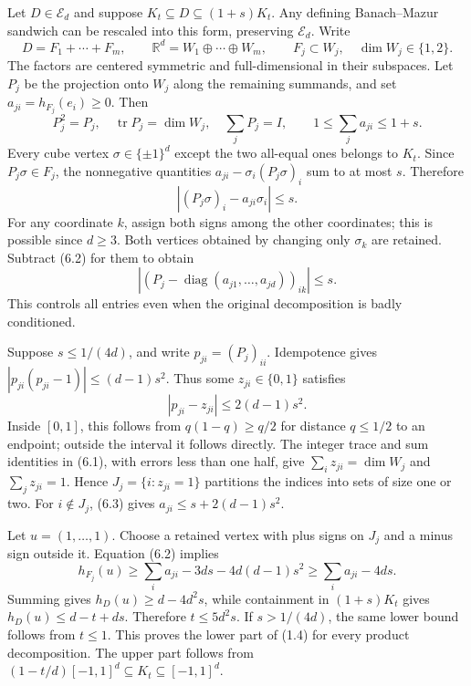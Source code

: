 \documentclass[
  11pt,
]{article}
\begin{document}
Let \(D\in\mathcal E_d\) and suppose
\(K_t\subseteq D\subseteq(1+s)K_t\). Any defining Banach--Mazur sandwich
can be rescaled into this form, preserving \(\mathcal E_d\). Write \[
 D=F_1+\cdots+F_m,\qquad
 \mathbb R^d=W_1\oplus\cdots\oplus W_m,
 \qquad F_j\subset W_j,\quad \dim W_j\in\{1,2\}.
\] The factors are centered symmetric and full-dimensional in their
subspaces. Let \(P_j\) be the projection onto \(W_j\) along the
remaining summands, and set \(a_{ji}=h_{F_j}(e_i)\ge0\). Then \[
 P_j^2=P_j,\quad\operatorname{tr}P_j=\dim W_j,\quad\sum_jP_j=I,
 \qquad 1\le\sum_ja_{ji}\le1+s.                               \tag{6.1}
\] Every cube vertex \(\sigma\in\{\pm1\}^d\) except the two all-equal
ones belongs to \(K_t\). Since \(P_j\sigma\in F_j\), the nonnegative
quantities \(a_{ji}-\sigma_i(P_j\sigma)_i\) sum to at most \(s\).
Therefore \[
 |(P_j\sigma)_i-a_{ji}\sigma_i|\le s.                          \tag{6.2}
\] For any coordinate \(k\), assign both signs among the other
coordinates; this is possible since \(d\ge3\). Both vertices obtained by
changing only \(\sigma_k\) are retained. Subtract (6.2) for them to
obtain \[
 |(P_j-\operatorname{diag}(a_{j1},\ldots,a_{jd}))_{ik}|\le s.     \tag{6.3}
\] This controls all entries even when the original decomposition is
badly conditioned.

Suppose \(s\le1/(4d)\), and write \(p_{ji}=(P_j)_{ii}\). Idempotence
gives \(|p_{ji}(p_{ji}-1)|\le(d-1)s^2\). Thus some \(z_{ji}\in\{0,1\}\)
satisfies \[
 |p_{ji}-z_{ji}|\le2(d-1)s^2.
\] Inside \([0,1]\), this follows from \(q(1-q)\ge q/2\) for distance
\(q\le1/2\) to an endpoint; outside the interval it follows directly.
The integer trace and sum identities in (6.1), with errors less than one
half, give \(\sum_i z_{ji}=\dim W_j\) and \(\sum_jz_{ji}=1\). Hence
\(J_j=\{i:z_{ji}=1\}\) partitions the indices into sets of size one or
two. For \(i\notin J_j\), (6.3) gives \(a_{ji}\le s+2(d-1)s^2\).

Let \(u=(1,\ldots,1)\). Choose a retained vertex with plus signs on
\(J_j\) and a minus sign outside it. Equation (6.2) implies \[
 h_{F_j}(u)\ge\sum_i a_{ji}-3ds-4d(d-1)s^2
            \ge\sum_i a_{ji}-4ds.
\] Summing gives \(h_D(u)\ge d-4d^2s\), while containment in
\((1+s)K_t\) gives \(h_D(u)\le d-t+ds\). Therefore \(t\le5d^2s\). If
\(s>1/(4d)\), the same lower bound follows from \(t\le1\). This proves
the lower part of (1.4) for every product decomposition. The upper part
follows from \((1-t/d)[-1,1]^d\subseteq K_t\subseteq[-1,1]^d\).
\end{document}
